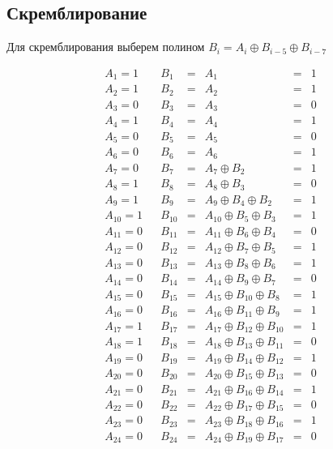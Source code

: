 \documentclass[12pt,a4paper]{report}
\begin{document}
\subsection*{Скремблирование}
Для скремблирования выберем полином $B_i = A_i \oplus B_{i-5} \oplus B_{i-7}$

$$
\begin{array}{lllllll}
    A_{1} = 1 & & B_1 & = & A_1 & = & 1 \\
    A_{2} = 1 & & B_2 & = & A_2 & = & 1 \\
    A_{3} = 0 & & B_3 & = & A_3 & = & 0 \\
    A_{4} = 1 & & B_4 & = & A_4 & = & 1 \\
    A_{5} = 0 & & B_5 & = & A_5 & = & 0 \\
    A_{6} = 0 & & B_6 & = & A_6 & = & 1 \\
    A_{7} = 0 & & B_{7} & = & A_{7} \oplus B_{2} & = & 1 \\
    A_{8} = 1 & & B_{8} & = & A_{8} \oplus B_{3} & = & 0 \\
    A_{9} = 1 & & B_{9} & = & A_{9} \oplus B_{4} \oplus B_{2} & = & 1 \\
    A_{10} = 1 & & B_{10} & = & A_{10} \oplus B_{5} \oplus B_{3} & = & 1 \\
    A_{11} = 0 & & B_{11} & = & A_{11} \oplus B_{6} \oplus B_{4} & = & 0 \\
    A_{12} = 0 & & B_{12} & = & A_{12} \oplus B_{7} \oplus B_{5} & = & 1 \\
    A_{13} = 0 & & B_{13} & = & A_{13} \oplus B_{8} \oplus B_{6} & = & 1 \\
    A_{14} = 0 & & B_{14} & = & A_{14} \oplus B_{9} \oplus B_{7} & = & 0 \\
    A_{15} = 0 & & B_{15} & = & A_{15} \oplus B_{10} \oplus B_{8} & = & 1 \\
    A_{16} = 0 & & B_{16} & = & A_{16} \oplus B_{11} \oplus B_{9} & = & 1 \\
    A_{17} = 1 & & B_{17} & = & A_{17} \oplus B_{12} \oplus B_{10} & = & 1 \\
    A_{18} = 1 & & B_{18} & = & A_{18} \oplus B_{13} \oplus B_{11} & = & 0 \\
    A_{19} = 0 & & B_{19} & = & A_{19} \oplus B_{14} \oplus B_{12} & = & 1 \\
    A_{20} = 0 & & B_{20} & = & A_{20} \oplus B_{15} \oplus B_{13} & = & 0 \\
    A_{21} = 0 & & B_{21} & = & A_{21} \oplus B_{16} \oplus B_{14} & = & 1 \\
    A_{22} = 0 & & B_{22} & = & A_{22} \oplus B_{17} \oplus B_{15} & = & 0 \\
    A_{23} = 0 & & B_{23} & = & A_{23} \oplus B_{18} \oplus B_{16} & = & 1 \\
    A_{24} = 0 & & B_{24} & = & A_{24} \oplus B_{19} \oplus B_{17} & = & 0 \\
\end{array}
$$
\end{document}

